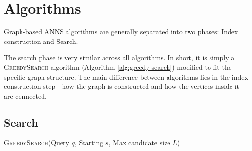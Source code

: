 \chapter{Algorithms}

Graph-based ANNS algorithms are generally separated into two phases: Index construction and Search.

The search phase is very similar across all algorithms. In short, it is simply a \textsc{GreedySearch} algorithm (Algorithm \ref{alg:greedy-search}) modified to fit the specific graph structure. The main difference between algorithms lies in the index construction step---how the graph is constructed and how the vertices inside it are connected.

\section{Search}

\begin{algorithm}[H]
    \caption{\textsc{GreedySearch}(Query \(q\), Starting \(s\), Max candidate size \(L\))}\label{alg:greedy-search}
    \begin{algorithmic}[1]
         
            \EndIf
        \EndWhile
    \end{algorithmic}
\end{algorithm}

